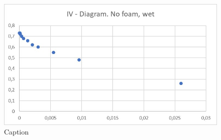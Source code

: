 \begin{figure}[ht]
    \centering
    \includegraphics[width=\textwidth]{DIV./Bilder/IVcurveW.jpg}
    \caption{Caption}
    \label{fig:IVcurveW}
\end{figure}
